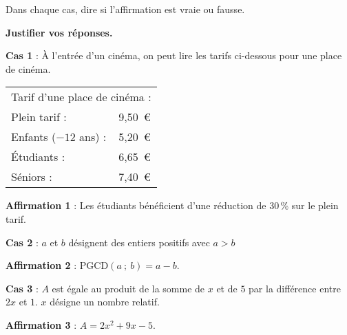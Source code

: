 
\medskip

Dans chaque cas, dire si l'affirmation est vraie ou fausse. 

\textbf{Justifier vos réponses.}

\medskip
 
\textbf{Cas 1 }: À l'entrée d'un cinéma, on peut lire les tarifs ci-dessous pour une place de cinéma.

\begin{center}
\begin{tabularx}{0.45\linewidth}{|l X|}\hline
\multicolumn{2}{|c|}{Tarif d'une place de cinéma :}\\ 
Plein tarif :			& 9,50~\euro\\ 
Enfants ($- 12$ ans) :	& 5,20~\euro\\
Étudiants :				& 6,65~\euro \\
Séniors :				& 7,40~\euro \\\hline
\end{tabularx}
\end{center}
  
\textbf{Affirmation 1 }: Les étudiants bénéficient d'une réduction de 30\,\% sur le plein tarif.

\medskip
 
\textbf{Cas 2 }: $a$ et $b$ désignent des entiers positifs avec $a > b$ 

\textbf{Affirmation 2 } : PGCD$(a~;~b) = a - b$.

\medskip
 
\textbf{Cas 3 }: $A$ est égale au produit de la somme de $x$ et de $5$ par la différence entre $2x$ et $1$. $x$ désigne un nombre relatif. 

\textbf{Affirmation 3 }: $A = 2x^2 + 9x - 5$. 

\bigskip

